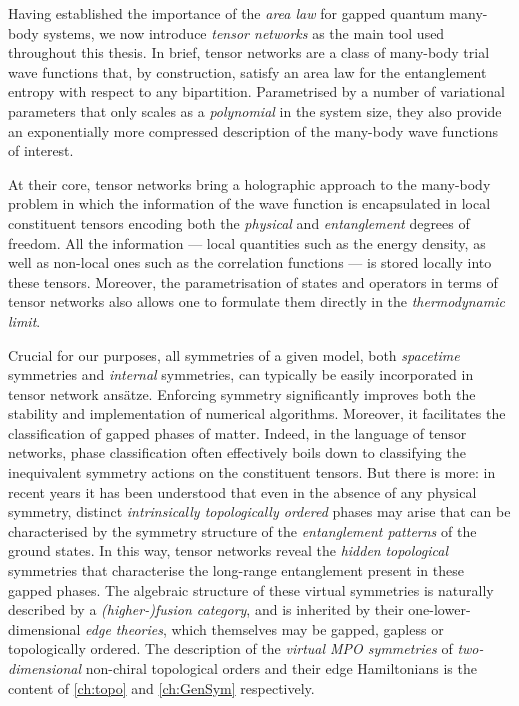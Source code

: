Having established the importance of the \emph{area law} for gapped quantum many-body systems, we now introduce \emph{tensor networks} as the main tool used throughout this thesis. In brief, tensor networks are a class of many-body trial wave functions that, by construction, satisfy an area law for the entanglement entropy with respect to any bipartition. Parametrised by a number of variational parameters that only scales as a \emph{polynomial} in the system size, they also provide an exponentially more compressed description of the many-body wave functions of interest.

At their core, tensor networks bring a holographic approach to the many-body problem in which the information of the wave function is encapsulated in local constituent tensors encoding both the \emph{physical} and \emph{entanglement} degrees of freedom. All the information --- local quantities such as the energy density, as well as non-local ones such as the correlation functions --- is stored locally into these tensors. Moreover, the parametrisation of states and operators in terms of tensor networks also allows one to formulate them directly in the \emph{thermodynamic limit}.

Crucial for our purposes, all symmetries of a given model, both \emph{spacetime} symmetries and \emph{internal} symmetries, can typically be easily incorporated in tensor network ans\"atze. Enforcing symmetry significantly improves both the stability and implementation of numerical algorithms. Moreover, it facilitates the classification of gapped phases of matter. Indeed, in the language of tensor networks, phase classification often effectively boils down to classifying the inequivalent symmetry actions on the constituent tensors. But there is more: in recent years it has been understood that even in the absence of any physical symmetry, distinct \emph{intrinsically topologically ordered} phases may arise that can be characterised by the symmetry structure of the \emph{entanglement patterns} of the ground states. In this way, tensor networks reveal the \emph{hidden} \emph{topological} symmetries that characterise the long-range entanglement present in these gapped phases. The algebraic structure of these virtual symmetries is naturally described by a \emph{(higher-)fusion category}, and is inherited by their one-lower-dimensional \emph{edge theories}, which themselves may be gapped, gapless or topologically ordered. The description of the \emph{virtual MPO symmetries} of \emph{two-dimensional} non-chiral topological orders and their edge Hamiltonians is the content of \cref{ch:topo} and \cref{ch:GenSym} respectively.

